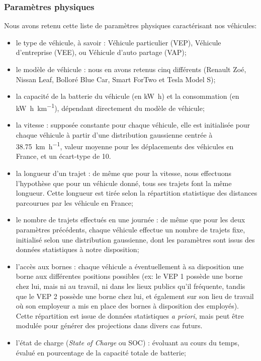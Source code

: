 		
		\subsubsection{Paramètres physiques}
			Nous avons retenu cette liste de paramètres physiques caractérisant nos véhicules:
			\begin{itemize}
				\item le type de véhicule, à savoir : Véhicule particulier (VEP), Véhicule d'entreprise (VEE), ou Véhicule d'auto partage (VAP);
				\item le modèle de véhicule : nous en avons retenus cinq différents (Renault Zoé, Nissan Leaf, Bolloré Blue Car, Smart ForTwo et Tesla Model S);
				\item la capacité de la batterie du véhicule (en \si{\kilo\watt\hour}) et la consommation (en \si{\kilo\watt\hour\per\kilo\meter}), dépendant directement du modèle de véhicule;
				\item la vitesse : supposée constante pour chaque véhicule, elle est initialisée pour chaque véhicule à partir d'une distribution gaussienne centrée à \SI{38,75}{\kilo\meter\per\hour}, valeur moyenne pour les déplacements des véhicules en France, et un écart-type de 10.
				\item la longueur d'un trajet : de même que pour la vitesse, nous effectuons l'hypothèse que pour un véhicule donné, tous ses trajets font la même longueur. Cette longueur est tirée selon la répartition statistique des distances parcourues par les véhicule en France;
				\item le nombre de trajets effectués en une journée : de même que pour les deux paramètres précédents, chaque véhicule effectue un nombre de trajets fixe, initialisé selon une distribution gaussienne, dont les paramètres sont issus des données statistiques à notre disposition;
				\item l'accès aux bornes : chaque véhicule a éventuellement à sa disposition une borne aux différentes positions possibles (ex: le VEP \no{}1 possède une borne chez lui, mais ni au travail, ni dans les lieux publics qu'il fréquente, tandis que le VEP \no{}2 possède une borne chez lui, et également sur son lieu de travail où son employeur a mis en place des bornes à disposition des employés). Cette répartition est issue de données statistiques \emph{a priori}, mais peut être modulée pour générer des projections dans divers cas futurs.  
				\item l'état de charge (\emph{State of Charge} ou SOC) : évoluant au cours du temps, évalué en pourcentage de la capacité totale de batterie;

\end{itemize}
